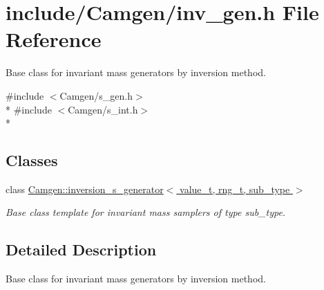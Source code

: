 \hypertarget{a00652}{\section{include/\-Camgen/inv\-\_\-gen.h File Reference}
\label{a00652}
}


Base class for invariant mass generators by inversion method.  


{\ttfamily \#include $<$Camgen/s\-\_\-gen.\-h$>$}\\*
{\ttfamily \#include $<$Camgen/s\-\_\-int.\-h$>$}\\*
\subsection*{Classes}
\begin{DoxyCompactItemize}
\item 
class \hyperlink{a00317}{Camgen\-::inversion\-\_\-s\-\_\-generator$<$ value\-\_\-t, rng\-\_\-t, sub\-\_\-type $>$}
\begin{DoxyCompactList}\small\item\em Base class template for invariant mass samplers of type sub\-\_\-type. \end{DoxyCompactList}\end{DoxyCompactItemize}


\subsection{Detailed Description}
Base class for invariant mass generators by inversion method. 
